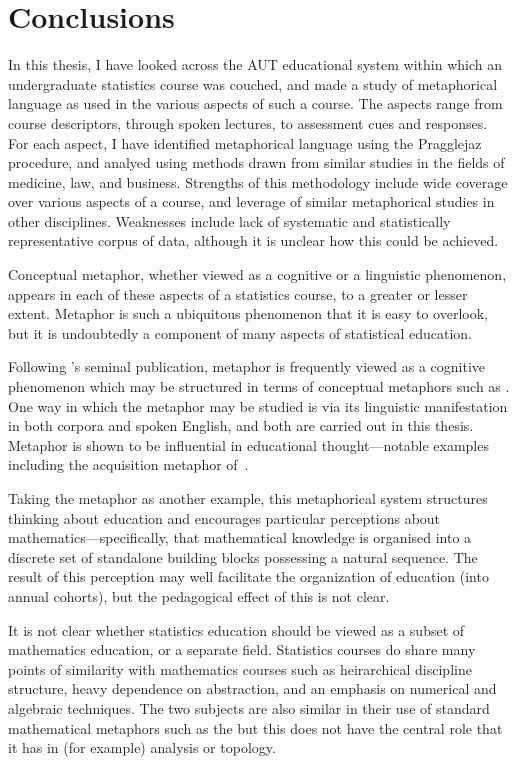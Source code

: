\chapter{Conclusions}
\label{chapter8}

In this thesis, I have looked across the AUT educational system within
which an undergraduate statistics course was couched, and made a study
of metaphorical language as used in the various aspects of such a
course.  The aspects range from course descriptors, through spoken
lectures, to assessment cues and responses.  For each aspect, I have
identified metaphorical language using the Pragglejaz procedure, and
analyed using methods drawn from similar studies in the fields of
medicine, law, and business.  Strengths of this methodology include
wide coverage over various aspects of a course, and leverage of
similar metaphorical studies in other disciplines.  Weaknesses include
lack of systematic and statistically representative corpus of data,
although it is unclear how this could be achieved.

Conceptual metaphor, whether viewed as a cognitive or a linguistic
phenomenon, appears in each of these aspects of a statistics course,
to a greater or lesser extent.  Metaphor is such a ubiquitous
phenomenon that it is easy to overlook, but it is undoubtedly a
component of many aspects of statistical education.

Following \citeauthor{lakoff1980}'s seminal publication, metaphor is
frequently viewed as a cognitive phenomenon which may be structured in
terms of conceptual metaphors such as .  One
way in which the metaphor may be studied is via its linguistic
manifestation in both corpora and spoken English, and both are carried
out in this thesis.  Metaphor is shown to be influential in
educational thought---notable examples including the acquisition
metaphor of~.

Taking the  metaphor as another example, this
metaphorical system structures thinking about education and encourages
particular perceptions about mathematics---specifically, that
mathematical knowledge is organised into a discrete set of standalone
building blocks possessing a natural sequence.  The result of this
perception may well facilitate the organization of education (into
annual cohorts), but the pedagogical effect of this is not clear.

It is not clear whether statistics education should be viewed as a
subset of mathematics education, or a separate field.  Statistics
courses do share many points of similarity with mathematics courses
such as heirarchical discipline structure, heavy dependence on
abstraction, and an emphasis on numerical and algebraic techniques.
The two subjects are also similar in their use of standard
mathematical metaphors such as the 
but this does not have the central role that it has in (for example)
analysis or topology.

